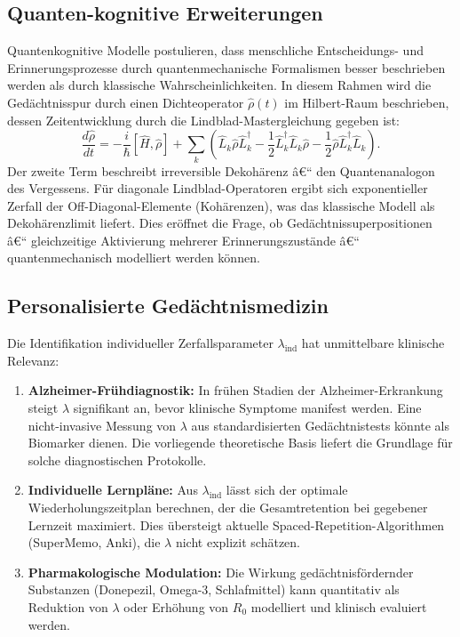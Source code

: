 ﻿\documentclass[12pt,a4paper,twoside]{article}
\theoremstyle{theormstyle}
\theoremstyle{proofstyle}
\begin{document}
	\subsection{Quanten-kognitive Erweiterungen}
	
	Quantenkognitive Modelle \citep{busemeyer2012quantum} postulieren,
	dass menschliche Entscheidungs- und Erinnerungsprozesse durch quantenmechanische
	Formalismen besser beschrieben werden als durch klassische Wahrscheinlichkeiten.
	In diesem Rahmen wird die Gedächtnisspur durch einen Dichteoperator
	$\hat{\rho}(t)$ im Hilbert-Raum beschrieben, dessen Zeitentwicklung
	durch die Lindblad-Mastergleichung gegeben ist:
	\[
	\frac{d\hat{\rho}}{dt}
	= -\frac{i}{\hbar}[\hat{H}, \hat{\rho}]
	+ \sum_k \left(\hat{L}_k \hat{\rho} \hat{L}_k^\dagger
	- \frac{1}{2}\hat{L}_k^\dagger \hat{L}_k \hat{\rho}
	- \frac{1}{2}\hat{\rho} \hat{L}_k^\dagger \hat{L}_k\right).
	\]
	Der zweite Term beschreibt irreversible Dekohärenz â€“ den Quantenanalogon
	des Vergessens. Für diagonale Lindblad-Operatoren ergibt sich
	exponentieller Zerfall der Off-Diagonal-Elemente (Kohärenzen),
	was das klassische Modell als Dekohärenzlimit liefert.
	Dies eröffnet die Frage, ob Gedächtnissuperpositionen â€“ gleichzeitige
	Aktivierung mehrerer Erinnerungszustände â€“ quantenmechanisch modelliert
	werden können.
	
	\subsection{Personalisierte Gedächtnismedizin}
	
	Die Identifikation individueller Zerfallsparameter $\lambda_{\mathrm{ind}}$
	hat unmittelbare klinische Relevanz:
	\begin{enumerate}[label=(\arabic*)]
		\item \textbf{Alzheimer-Frühdiagnostik:} In frühen Stadien der
		Alzheimer-Erkrankung steigt $\lambda$ signifikant an, bevor
		klinische Symptome manifest werden. Eine nicht-invasive Messung
		von $\lambda$ aus standardisierten Gedächtnistests könnte
		als Biomarker dienen. Die vorliegende theoretische Basis
		liefert die Grundlage für solche diagnostischen Protokolle.
		\item \textbf{Individuelle Lernpläne:} Aus $\lambda_{\mathrm{ind}}$
		lässt sich der optimale Wiederholungszeitplan berechnen,
		der die Gesamtretention bei gegebener Lernzeit maximiert.
		Dies übersteigt aktuelle Spaced-Repetition-Algorithmen
		(SuperMemo, Anki), die $\lambda$ nicht explizit schätzen.
		\item \textbf{Pharmakologische Modulation:} Die Wirkung gedächtnisfördernder
		Substanzen (Donepezil, Omega-3, Schlafmittel) kann quantitativ
		als Reduktion von $\lambda$ oder Erhöhung von $R_0$ modelliert
		und klinisch evaluiert werden.
	\end{enumerate}
	
\end{document}
